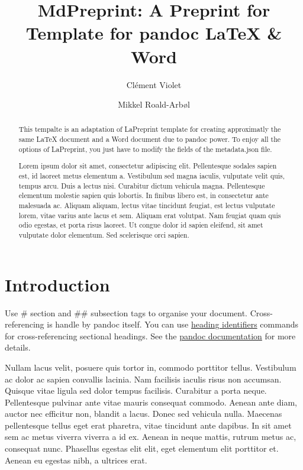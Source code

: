 \documentclass[9pt,biorxiv,doublespacing,lineno]{lapreprint}
\title{MdPreprint: A Preprint for Template for pandoc LaTeX \& Word}
\author[ \orcidlink{0000-0001-6217-5891} 1\Letter]{Clément Violet}
\author[ \orcidlink{0000-0002-9998-0058} 2]{Mikkel Roald-Arbøl}
\affil[1]{IFREMER, Centre de Bretagne, DYNECO LEBCO, Plouzané, France}
\affil[2]{School of Life Sciences, Univeristy of Sussex, Brighton and
Hove, Great Britain}
\begin{document}
\maketitle
\begin{abstract}

This tempalte is an adaptation of LaPreprint template for creating
approximatly the same LaTeX document and a Word document due to pandoc
power. To enjoy all the options of LaPreprint, you just have to modify
the fields of the metadata.json file.

Lorem ipsum dolor sit amet, consectetur adipiscing elit. Pellentesque
sodales sapien est, id laoreet metus elementum a. Vestibulum sed magna
iaculis, vulputate velit quis, tempus arcu. Duis a lectus nisi.
Curabitur dictum vehicula magna. Pellentesque elementum molestie sapien
quis lobortis. In finibus libero est, in consectetur ante malesuada ac.
Aliquam aliquam, lectus vitae tincidunt feugiat, est lectus vulputate
lorem, vitae varius ante lacus et sem. Aliquam erat volutpat. Nam
feugiat quam quis odio egestas, et porta risus laoreet. Ut congue dolor
id sapien eleifend, sit amet vulputate dolor elementum. Sed scelerisque
orci sapien.
\end{abstract}

\hypertarget{introduction}{%
\section{Introduction}\label{introduction}}

Use \# section and \#\# subsection tags to organise your document.
Cross-referencing is handle by pandoc itself. You can use
\protect\hyperlink{introduction}{heading identifiers} commands for
cross-referencing sectional headings. See the
\href{https://pandoc.org/MANUAL.html\#extension-auto_identifiers}{pandoc
documentation} for more details.

Nullam lacus velit, posuere quis tortor in, commodo porttitor tellus.
Vestibulum ac dolor ac sapien convallis lacinia. Nam facilisis iaculis
risus non accumsan. Quisque vitae ligula sed dolor tempus facilisis.
Curabitur a porta neque. Pellentesque pulvinar ante vitae mauris
consequat commodo. Aenean ante diam, auctor nec efficitur non, blandit a
lacus. Donec sed vehicula nulla. Maecenas pellentesque tellus eget erat
pharetra, vitae tincidunt ante dapibus. In sit amet sem ac metus viverra
viverra a id ex. Aenean in neque mattis, rutrum metus ac, consequat
nunc. Phasellus egestas elit elit, eget elementum elit porttitor et.
Aenean eu egestas nibh, a ultrices erat.
\end{document}
